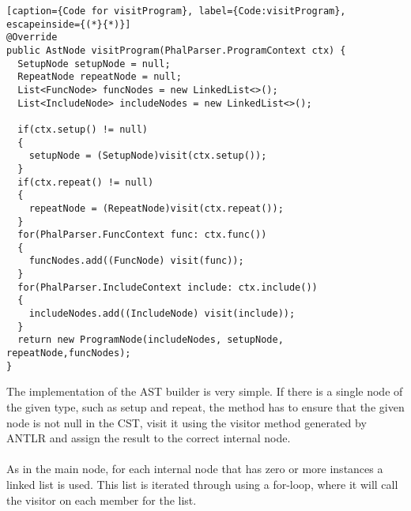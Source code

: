 \begin{lstlisting}[caption={Code for visitProgram}, label={Code:visitProgram}, escapeinside={(*}{*)}]
@Override
public AstNode visitProgram(PhalParser.ProgramContext ctx) {
  SetupNode setupNode = null;
  RepeatNode repeatNode = null;
  List<FuncNode> funcNodes = new LinkedList<>();
  List<IncludeNode> includeNodes = new LinkedList<>();
	
  if(ctx.setup() != null)
  {
    setupNode = (SetupNode)visit(ctx.setup());
  }
  if(ctx.repeat() != null)
  {
    repeatNode = (RepeatNode)visit(ctx.repeat());
  }
  for(PhalParser.FuncContext func: ctx.func()) 
  {
    funcNodes.add((FuncNode) visit(func));
  }
  for(PhalParser.IncludeContext include: ctx.include()) 
  {
    includeNodes.add((IncludeNode) visit(include));
  }
  return new ProgramNode(includeNodes, setupNode, repeatNode,funcNodes);
}
\end{lstlisting}
The implementation of the AST builder is very simple. If there is a single node of the given type, such as setup and repeat, the method has to ensure that the given node is not null in the CST, visit it using the visitor method generated by ANTLR and assign the result to the correct internal node.
\\\\
As in the main node, for each internal node that has zero or more instances a linked list is used. This list is iterated through using a for-loop, where it will call the visitor on each member for the list.

